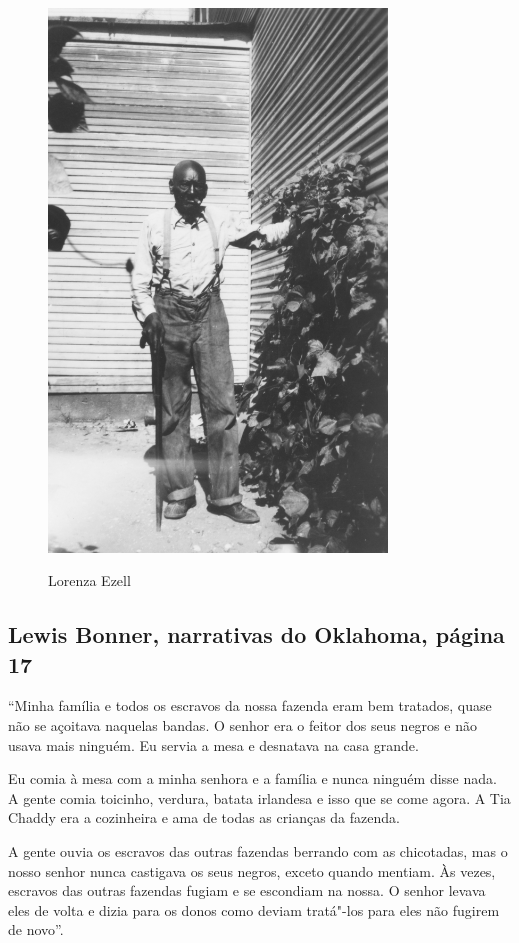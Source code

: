 \pagebreak
\thispagestyle{empty}
\begin{figure}[!ht]
\centering
 \includegraphics[width=90mm]{./imgs/lorenzaezzell_recorte.jpg} \label{img7}
\caption{Lorenza Ezell}
\end{figure}

\subsection{Lewis Bonner, narrativas do Oklahoma, página 17} \label{ref28}

``Minha família e todos os escravos da nossa fazenda eram bem tratados,
quase não se açoitava naquelas bandas. O senhor era o feitor dos seus
negros e não usava mais ninguém. Eu servia a mesa e desnatava na casa
grande.

Eu comia à mesa com a minha senhora e a família e nunca ninguém disse
nada. A gente comia toicinho, verdura, batata irlandesa e isso que se
come agora. A Tia Chaddy era a cozinheira e ama de todas as crianças da
fazenda.

A gente ouvia os escravos das outras fazendas berrando com as
chicotadas, mas o nosso senhor nunca castigava os seus negros, exceto
quando mentiam. Às vezes, escravos das outras fazendas fugiam e se
escondiam na nossa. O senhor levava eles de volta e dizia para os donos
como deviam tratá"-los para eles não fugirem de novo''.

